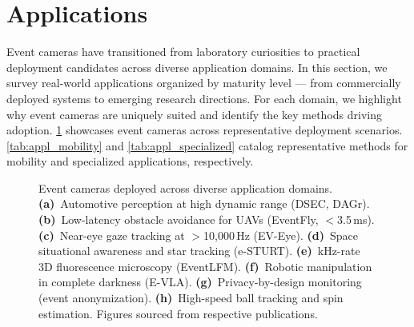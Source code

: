 \section{Applications}
\label{sec:appl}

Event cameras have transitioned from laboratory curiosities to practical deployment candidates across diverse application domains. In this section, we survey real-world applications organized by maturity level --- from commercially deployed systems to emerging research directions. For each domain, we highlight why event cameras are uniquely suited and identify the key methods driving adoption. \cref{fig:applications} showcases event cameras across representative deployment scenarios. \cref{tab:appl_mobility} and \cref{tab:appl_specialized} catalog representative methods for mobility and specialized applications, respectively.

\begin{figure}[t]
    \centering
    \caption{Event cameras deployed across diverse application domains. \textbf{(a)}~Automotive perception at high dynamic range (DSEC, DAGr). \textbf{(b)}~Low-latency obstacle avoidance for UAVs (EventFly, $<$3.5\,ms). \textbf{(c)}~Near-eye gaze tracking at $>$10,000\,Hz (EV-Eye). \textbf{(d)}~Space situational awareness and star tracking (e-STURT). \textbf{(e)}~kHz-rate 3D fluorescence microscopy (EventLFM). \textbf{(f)}~Robotic manipulation in complete darkness (E-VLA). \textbf{(g)}~Privacy-by-design monitoring (event anonymization). \textbf{(h)}~High-speed ball tracking and spin estimation. Figures sourced from respective publications.}
    \label{fig:applications}
\end{figure}


